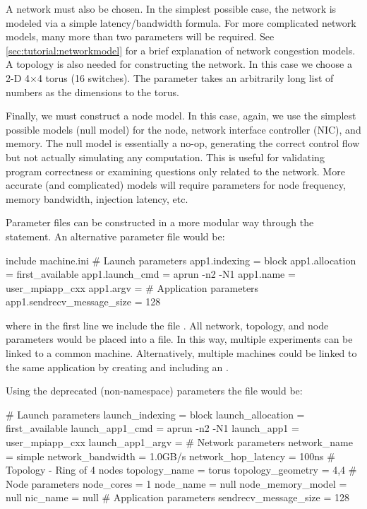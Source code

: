 A network must also be chosen.  
In the simplest possible case, the network is modeled via a simple latency/bandwidth formula.  
For more complicated network models, many more than two parameters will be required. 
See \ref{sec:tutorial:networkmodel} for a brief explanation of \sstmacro network congestion models. 
A topology is also needed for constructing the network.  
In this case we choose a 2-D 4$\times$4 torus (16 switches).  The  
parameter takes an arbitrarily long list of numbers as the dimensions to the torus.

Finally, we must construct a node model.  
In this case, again, we use the simplest possible models (null model) for the node, 
network interface controller (NIC), and memory.  
The null model is essentially a no-op, generating the correct control flow but not actually simulating any computation. 
This is useful for validating program correctness or examining questions only related to the network.  
More accurate (and complicated) models will require parameters for node frequency, memory bandwidth, injection latency, etc.

Parameter files can be constructed in a more modular way through the  statement.  
An alternative parameter file would be:

\begin{ViFile}
include machine.ini
# Launch parameters
app1.indexing = block
app1.allocation = first_available
app1.launch_cmd = aprun -n2 -N1
app1.name = user_mpiapp_cxx
app1.argv = 
# Application parameters
app1.sendrecv_message_size = 128
\end{ViFile}
where in the first line we include the file .  
All network, topology, and node parameters would be placed into a  file.  
In this way, multiple experiments can be linked to a common machine.  
Alternatively, multiple machines could be linked to the same application by creating and including an .

Using the deprecated (non-namespace) parameters the file would be:

\begin{ViFile}
# Launch parameters
launch_indexing = block
launch_allocation = first_available
launch_app1_cmd = aprun -n2 -N1
launch_app1 = user_mpiapp_cxx
launch_app1_argv = 
# Network parameters
network_name = simple
network_bandwidth = 1.0GB/s
network_hop_latency = 100ns
# Topology - Ring of 4 nodes
topology_name = torus
topology_geometry = 4,4
# Node parameters
node_cores = 1
node_name = null
node_memory_model = null
nic_name = null
# Application parameters
sendrecv_message_size = 128
\end{ViFile}

